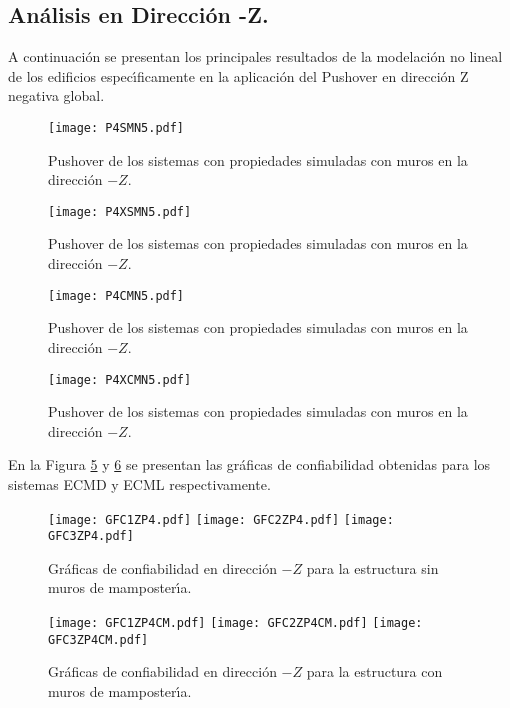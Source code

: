 \newpage

\subsection{An\'alisis en Direcci\'on -Z.}

A continuaci\'on se presentan los principales resultados de la modelaci\'on no lineal de los edificios espec\'{\i}ficamente en la aplicaci\'on del Pushover en direcci\'on Z negativa global.

\begin{figure} [htbp]
\texttt{[image: P4SMN5.pdf]}
\caption{Pushover de los sistemas con propiedades simuladas con muros en la direcci\'on $-Z$.}
\label{fig:apu33}
\end{figure}

\begin{figure} [htbp]
\texttt{[image: P4XSMN5.pdf]}
\caption{Pushover de los sistemas con propiedades simuladas con muros en la direcci\'on $-Z$.}
\label{fig:apu34}
\end{figure}

\begin{figure} [htbp]
\texttt{[image: P4CMN5.pdf]}
\caption{Pushover de los sistemas con propiedades simuladas con muros en la direcci\'on $-Z$.}
\label{fig:apu35}
\end{figure}

\begin{figure} [htbp]
\texttt{[image: P4XCMN5.pdf]}
\caption{Pushover de los sistemas con propiedades simuladas con muros en la direcci\'on $-Z$.}
\label{fig:apu36}
\end{figure}

En la Figura \ref{fig:apu37} y \ref{fig:apu38} se presentan las gr\'aficas de confiabilidad obtenidas para los sistemas ECMD y ECML respectivamente.

\newpage

\begin{figure} [htbp]
\centering
\texttt{[image: GFC1ZP4.pdf]}
\texttt{[image: GFC2ZP4.pdf]}
\texttt{[image: GFC3ZP4.pdf]}
\caption{Gr\'aficas de confiabilidad en direcci\'on $-Z$ para la estructura sin muros de mamposter\'{\i}a.}
\label{fig:apu37}
\end{figure}

\begin{figure} [htbp]
\centering
\texttt{[image: GFC1ZP4CM.pdf]}
\texttt{[image: GFC2ZP4CM.pdf]}
\texttt{[image: GFC3ZP4CM.pdf]}
\caption{Gr\'aficas de confiabilidad en direcci\'on $-Z$ para la estructura con muros de mamposter\'{\i}a.}
\label{fig:apu38}
\end{figure}

